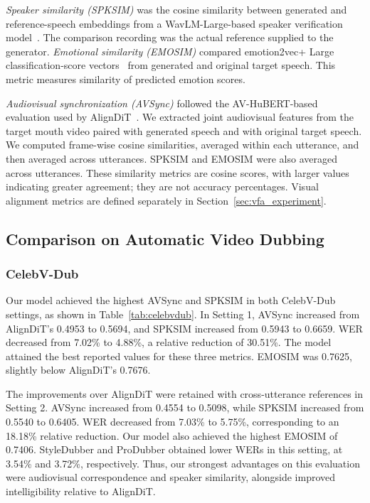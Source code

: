 \emph{Speaker similarity (SPKSIM)} was the cosine similarity between generated and reference-speech embeddings from a WavLM-Large-based speaker verification model~\cite{chen2022wavlm}. The comparison recording was the actual reference supplied to the generator. \emph{Emotional similarity (EMOSIM)} compared emotion2vec+ Large classification-score vectors~\cite{ma2024emotion2vec} from generated and original target speech. This metric measures similarity of predicted emotion scores.

\emph{Audiovisual synchronization (AVSync)} followed the AV-HuBERT-based evaluation used by AlignDiT~\cite{choi2025aligndit}. We extracted joint audiovisual features from the target mouth video paired with generated speech and with original target speech. We computed frame-wise cosine similarities, averaged within each utterance, and then averaged across utterances. SPKSIM and EMOSIM were also averaged across utterances. These similarity metrics are cosine scores, with larger values indicating greater agreement; they are not accuracy percentages. Visual alignment metrics are defined separately in Section~\ref{sec:vfa_experiment}.




\subsection{Comparison on Automatic Video Dubbing}
\label{sec:dubbing_results}

\subsubsection{CelebV-Dub}

Our model achieved the highest AVSync and SPKSIM in both CelebV-Dub settings, as shown in Table~\ref{tab:celebvdub}. In Setting 1, AVSync increased from AlignDiT's 0.4953 to 0.5694, and SPKSIM increased from 0.5943 to 0.6659. WER decreased from 7.02\% to 4.88\%, a relative reduction of 30.51\%. The model attained the best reported values for these three metrics. EMOSIM was 0.7625, slightly below AlignDiT's 0.7676.

The improvements over AlignDiT were retained with cross-utterance references in Setting 2. AVSync increased from 0.4554 to 0.5098, while SPKSIM increased from 0.5540 to 0.6405. WER decreased from 7.03\% to 5.75\%, corresponding to an 18.18\% relative reduction. Our model also achieved the highest EMOSIM of 0.7406. StyleDubber and ProDubber obtained lower WERs in this setting, at 3.54\% and 3.72\%, respectively. Thus, our strongest advantages on this evaluation were audiovisual correspondence and speaker similarity, alongside improved intelligibility relative to AlignDiT.

